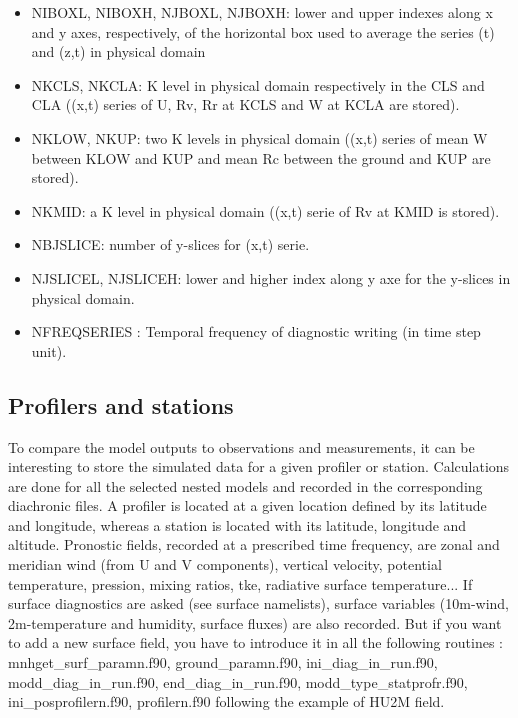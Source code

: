 \begin{itemize}
\item
NIBOXL, NIBOXH, NJBOXL, NJBOXH: lower and upper indexes along x and y axes, respectively, 
 of the horizontal box used to average the series (t) and (z,t) in physical domain
\item
NKCLS, NKCLA: K level in physical domain respectively in the CLS and CLA ((x,t) series of
 U, Rv, Rr at KCLS and W at KCLA are stored).
\item NKLOW, NKUP: two K levels in physical domain ((x,t) series of mean W between KLOW and KUP
 and mean Rc between the ground and KUP are stored).
\item NKMID: a K level in physical domain ((x,t) serie of Rv at KMID is stored).
\item NBJSLICE: number of y-slices for (x,t) serie.
\item NJSLICEL, NJSLICEH: lower and higher index along y axe for the y-slices in physical domain.
\item NFREQSERIES : Temporal frequency of diagnostic writing (in time step unit).                    
\end{itemize}

\subsection{Profilers and stations} 
\label{ss:station}
To compare the model outputs to observations
and measurements, it can be interesting to store the simulated data for a given
profiler or station. Calculations are done for all the selected nested models and recorded in the corresponding diachronic files.
 A profiler is located at a given location defined by its
latitude and longitude, whereas a station is located with its latitude, 
longitude and altitude.
Pronostic fields, recorded at a prescribed time frequency, are
zonal and meridian wind
(from U and V components), vertical velocity, potential temperature, pression,
mixing ratios, tke, radiative surface temperature...
If surface diagnostics are asked (see surface namelists), surface variables
(10m-wind, 2m-temperature and humidity, surface fluxes) are also recorded. But if you want to add a new surface field, you have to introduce it in all the following routines : mnhget\_surf\_paramn.f90, ground\_paramn.f90, ini\_diag\_in\_run.f90, modd\_diag\_in\_run.f90, end\_diag\_in\_run.f90, modd\_type\_statprofr.f90, ini\_posprofilern.f90, profilern.f90 following the example of HU2M field.

